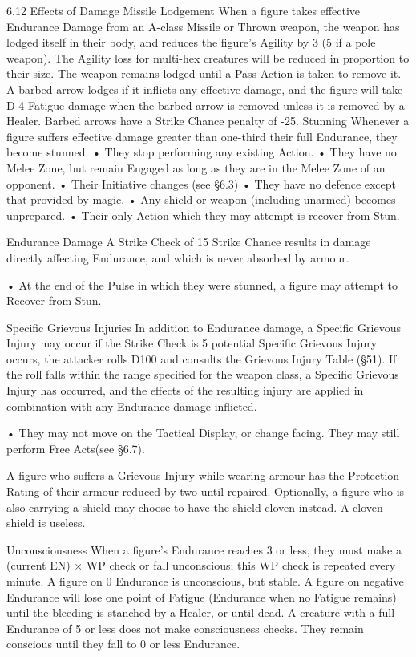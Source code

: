 \documentclass[a4paper]{article}
\begin{document}
\begin{multicols}{3}
6.12 Effects of Damage
Missile Lodgement
When a figure takes effective Endurance Damage
from an A-class Missile or Thrown weapon, the
weapon has lodged itself in their body, and reduces
the figure’s Agility by 3 (5 if a pole weapon). The
Agility loss for multi-hex creatures will be reduced
in proportion to their size. The weapon remains
lodged until a Pass Action is taken to remove it. A
barbed arrow lodges if it inflicts any effective
damage, and the figure will take D-4 Fatigue damage when the barbed arrow is removed unless it is
removed by a Healer. Barbed arrows have a Strike
Chance penalty of -25.
Stunning
Whenever a figure suffers effective damage greater
than one-third their full Endurance, they become
stunned.
• They stop performing any existing Action.
• They have no Melee Zone, but remain Engaged
as long as they are in the Melee Zone of an opponent.
• Their Initiative changes (see §6.3)
• They have no defence except that provided by
magic.
• Any shield or weapon (including unarmed) becomes unprepared.
• Their only Action which they may attempt is
recover from Stun.

Endurance Damage
A Strike Check of 15%
Strike Chance results in damage directly affecting
Endurance, and which is never absorbed by armour.

• At the end of the Pulse in which they were
stunned, a figure may attempt to Recover from
Stun.

Specific Grievous Injuries
In addition to Endurance damage, a Specific
Grievous Injury may occur if the Strike Check is
5%
potential Specific Grievous Injury occurs, the
attacker rolls D100 and consults the Grievous
Injury Table (§51). If the roll falls within the range
specified for the weapon class, a Specific Grievous
Injury has occurred, and the effects of the resulting
injury are applied in combination with any Endurance damage inflicted.

• They may not move on the Tactical Display, or
change facing. They may still perform Free
Acts(see §6.7).

A figure who suffers a Grievous Injury while wearing armour has the Protection Rating of their armour reduced by two until repaired. Optionally, a
figure who is also carrying a shield may choose to
have the shield cloven instead. A cloven shield is
useless.

Unconsciousness
When a figure’s Endurance reaches 3 or less, they
must make a (current EN) × WP check or fall
unconscious; this WP check is repeated every
minute. A figure on 0 Endurance is unconscious,
but stable. A figure on negative Endurance will
lose one point of Fatigue (Endurance when no
Fatigue remains) until the bleeding is stanched by a
Healer, or until dead. A creature with a full Endurance of 5 or less does not make consciousness
checks. They remain conscious until they fall to 0
or less Endurance.


\end{multicols}
\end{document}
